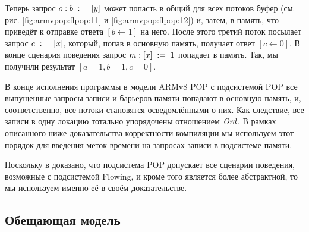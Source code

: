 Теперь запрос $o: b \;:=_{}\;[y]$ может попасть в общий для всех потоков буфер
(см. рис. \ref{fig:armvpop:flpop:11} и \ref{fig:armvpop:flpop:12}) и, затем, в память, что
приведёт к отправке ответа $[b \leftarrow 1]$ на него.
После этого третий поток посылает запрос $c \;:=_{}\;[x]$, который, попав в основную память,
получает ответ $[c \leftarrow 0]$.
В конце сценария поведения запрос $m : [x]\;:=\;1$ попадает в память.
Так, мы получили результат $[a = 1, b = 1, c = 0]$.

В конце исполнения программы в модели ARMv8 POP с подсистемой POP все выпущенные запросы записи и барьеров
памяти попадают в основную память, и, соответственно, все потоки становятся осведомлёнными о них.
Как следствие, все записи в одну локацию тотально упорядочены отношением $\mathit{Ord}$.
В рамках описанного ниже доказательства корректности компиляции мы используем этот порядок для введения меток времени
на запросах записи в подсистеме памяти.

Поскольку в \cite{Flur-al:POPL16} доказано, что подсистема POP допускает все сценарии поведения, возможные с подсистемой Flowing,
и кроме того является более абстрактной, то мы используем именно её в своём доказательстве.

\subsection{Обещающая модель}

